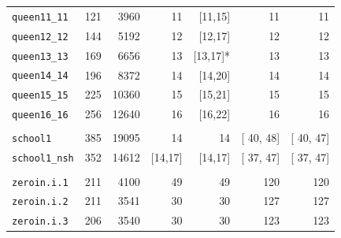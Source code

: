 \documentclass[a4paper,11pt,twoside]{book}
\begin{document}
\begin{multicols}{2}
\begin{center}
\begin{tabular}{|lrrrrrr|}
\verb/queen11_11/&  121  &   3960    &      11   &    [11,15]  &         11   &         11 \\
\verb/queen12_12/&  144  &   5192    &      12   &    [12,17]  &         12   &         12 \\
\verb/queen13_13/&  169  &   6656    &      13   &    [13,17]* &         13   &         13 \\
\verb/queen14_14/&  196  &   8372    &      14   &    [14,20]  &         14   &         14 \\
\verb/queen15_15/&  225  &  10360    &      15   &    [15,21]  &         15   &         15 \\
\verb/queen16_16/&  256  &  12640    &      16   &    [16,22]  &         16   &         16 \\
&&&&&&\\
\verb/school1/    & 385  &  19095   &       14   &         14  &   [ 40, 48]  &  [ 40, 47] \\
\verb/school1_nsh/& 352  &  14612   &   [14,17]  &    [14,17]  &   [ 37, 47]  &  [ 37, 47] \\
&&&&&&\\
\verb/zeroin.i.1/ & 211  &    4100  &        49  &         49  &         120  &        120 \\
\verb/zeroin.i.2/ & 211  &    3541  &        30  &         30  &         127  &        127 \\
\verb/zeroin.i.3/ & 206  &    3540  &        30  &         30  &         123  &        123 \\
\hline
\end{tabular}
\end{center}
\end{multicols}

\cleardoublepage
\printindex
\end{document}
